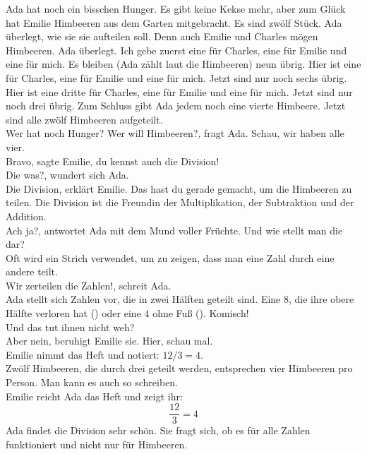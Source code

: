 Ada hat noch ein bisschen Hunger.
Es gibt keine Kekse mehr, aber zum Glück hat Emilie Himbeeren aus dem Garten mitgebracht.
Es sind zwölf Stück. Ada überlegt, wie sie sie aufteilen soll. 
Denn auch Emilie und Charles mögen Himbeeren. 
Ada überlegt. Ich gebe zuerst eine für Charles, eine für Emilie und eine für mich. 
Es bleiben (Ada zählt laut die Himbeeren) neun übrig. 
Hier ist eine für Charles, eine für Emilie und eine für mich. Jetzt sind nur noch sechs übrig. 
Hier ist eine dritte für Charles, eine für Emilie und eine für mich. Jetzt sind nur noch drei übrig. 
Zum Schluss gibt Ada jedem noch eine vierte Himbeere. Jetzt sind alle zwölf Himbeeren aufgeteilt.\\
\frqq{}Wer hat noch Hunger? Wer will Himbeeren?\flqq{}, fragt Ada. \frqq{}Schau, wir haben alle vier.\flqq{}\\
\frqq{}Bravo\flqq{}, sagte Emilie, \frqq{}du kennst auch die Division!\flqq{}\\
\frqq{}Die was?\flqq{}, wundert sich Ada.\\
\frqq{}Die Division\flqq{}, erklärt Emilie. \frqq{}Das hast du gerade gemacht, um die Himbeeren zu teilen. Die Division ist die Freundin der Multiplikation, der Subtraktion und der Addition.\flqq{}\\
\frqq{}Ach ja?\flqq{}, antwortet Ada mit dem Mund voller Früchte. \frqq{}Und wie stellt man die dar?\flqq{}\\
\frqq{}Oft wird ein Strich verwendet, um zu zeigen, dass man eine Zahl durch eine andere teilt.\flqq{}\\ 
\frqq{}Wir zerteilen die Zahlen!\flqq{}, schreit Ada.\\
Ada stellt sich Zahlen vor, die in zwei Hälften geteilt sind. Eine $8$, die ihre obere Hälfte verloren hat () oder eine $4$ ohne Fuß (). Komisch!\flqq{}\\
\frqq{}Und das tut ihnen nicht weh?\flqq{}\\
\frqq{}Aber nein\flqq{}, beruhigt Emilie sie. \frqq{}Hier, schau mal.\flqq{}\\
Emilie nimmt das Heft und notiert: $12/3=4$.\\
\frqq{}Zwölf Himbeeren, die durch drei geteilt werden, entsprechen vier Himbeeren pro Person. Man kann es auch so schreiben.\flqq{}\\
Emilie reicht Ada das Heft und zeigt ihr: 
$$\frac{12}{3}=4$$
Ada findet die Division sehr schön. Sie fragt sich, ob es für alle Zahlen funktioniert und nicht nur für Himbeeren. 

